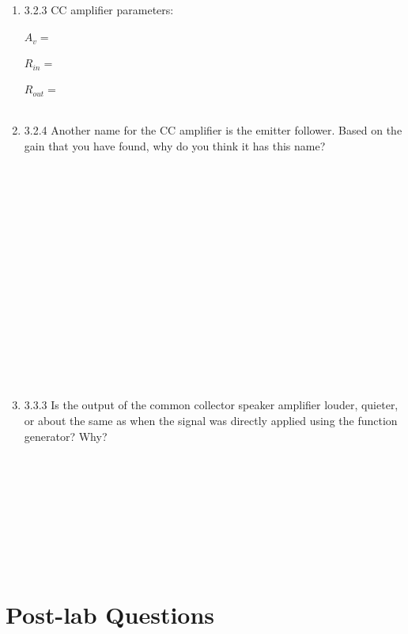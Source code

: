 \documentclass{article}
\begin{document}
\begin {enumerate}
   	\item[3.2.3] CC amplifier parameters: \\~\\
    	$\boxed{A_{v}    = ~~~~~~~~~~~~~~~~~~~~~~~}$ \\ ~ \\
    	$\boxed{R_{in}   = ~~~~~~~~~~~~~~~~~~~~~~~}$ \\ ~ \\
    	$\boxed{R_{out}  = ~~~~~~~~~~~~~~~~~~~~~~~}$ \\ ~ \\

	\item[3.2.4] Another name for the CC amplifier is the emitter follower. Based on the gain that you have found, why do you think it has this name?
	\\~\\~\\~\\~\\~\\~\\~\\~\\~\\~\\~\\~\\~\\~\\~\\
	
	\item[3.3.3] Is the output of the common collector speaker amplifier louder, quieter, or about the same as when the signal was directly applied using the function generator? Why? 
	\\~\\~\\~\\~\\~\\~\\~\\~\\
\end {enumerate}

\section{Post-lab Questions}
\end{document}
